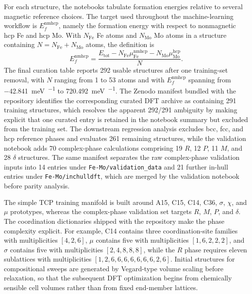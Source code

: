 For each structure, the notebooks tabulate formation energies relative to several magnetic reference choices. The target used throughout the machine-learning workflow is $E_f^{\mathrm{nmhcp}}$, namely the formation energy with respect to nonmagnetic hcp Fe and hcp Mo. With $N_{\mathrm{Fe}}$ Fe atoms and $N_{\mathrm{Mo}}$ Mo atoms in a structure containing $N=N_{\mathrm{Fe}}+N_{\mathrm{Mo}}$ atoms, the definition is
\begin{equation}
E_f^{\mathrm{nmhcp}} = \frac{E_{\mathrm{tot}} - N_{\mathrm{Fe}}\mu_{\mathrm{Fe}}^{\mathrm{nmhcp}} - N_{\mathrm{Mo}}\mu_{\mathrm{Mo}}^{\mathrm{hcp}}}{N}.
\label{eq:formation_energy}
\end{equation}
The final curation table reports 292 usable structures after one training-set removal, with $N$ ranging from 1 to 53 atoms and with $E_f^{\mathrm{nmhcp}}$ spanning from \SI{-42.841}{\milli\electronvolt\per\atom} to \SI{720.492}{\milli\electronvolt\per\atom}. The Zenodo manifest bundled with the repository identifies the corresponding curated DFT archive as containing 291 training structures, which resolves the apparent 292/291 ambiguity by making explicit that one curated entry is retained in the notebook summary but excluded from the training set. The downstream regression analysis excludes bcc, fcc, and hcp reference phases and evaluates 261 remaining structures, while the validation notebook adds 70 complex-phase calculations comprising 19 $R$, 12 $P$, 11 $M$, and 28 $\delta$ structures. The same manifest separates the raw complex-phase validation inputs into 14 entries under \texttt{Fe-Mo/validation\_data} and 21 further in-hull entries under \texttt{Fe-Mo/inchulldft}, which are merged by the validation notebook before parity analysis.

The simple TCP training manifold is built around A15, C15, C14, C36, $\sigma$, $\chi$, and $\mu$ prototypes, whereas the complex-phase validation set targets $R$, $M$, $P$, and $\delta$. The coordination dictionaries shipped with the repository make the phase complexity explicit. For example, C14 contains three coordination-site families with multiplicities $[4,2,6]$, $\mu$ contains five with multiplicities $[1,6,2,2,2]$, and $\sigma$ contains five with multiplicities $[2,4,8,8,8]$, while the $R$ phase requires eleven sublattices with multiplicities $[1,2,6,6,6,6,6,6,6,2,6]$. Initial structures for compositional sweeps are generated by Vegard-type volume scaling before relaxation, so that the subsequent DFT optimization begins from chemically sensible cell volumes rather than from fixed end-member lattices.

